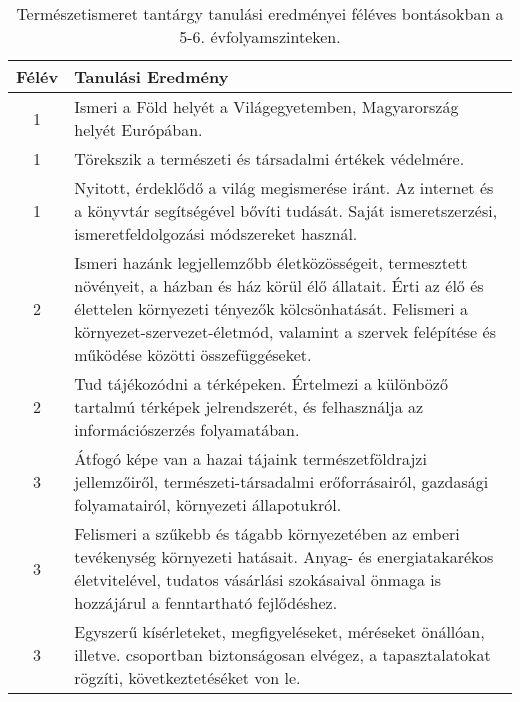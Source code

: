        
           \begin{longtable}{c | p{12cm} }
            \caption[Természetismeret 5-6.]{Természetismeret tantárgy tanulási eredményei féléves bontásokban a 5-6. évfolyamszinteken. }  \\

            \textbf{Félév} & \textbf{Tanulási Eredmény} \\
            \hline
            \endhead
                                
                                          1 &  Ismeri a Föld helyét a Világegyetemben, Magyarország helyét Európában. \\ \hline
                                          1 &  Törekszik a természeti és társadalmi értékek védelmére. \\ \hline
                                          1 &  Nyitott, érdeklődő a világ megismerése iránt. Az internet és a könyvtár segítségével bővíti tudását. Saját ismeretszerzési, ismeretfeldolgozási módszereket használ. \\ \hline
                                      
                                
                                          2 &  Ismeri hazánk legjellemzőbb életközösségeit, termesztett növényeit, a házban és ház körül élő állatait. Érti az élő és élettelen környezeti tényezők kölcsönhatását. Felismeri a környezet-szervezet-életmód, valamint a szervek felépítése és működése közötti összefüggéseket. \\ \hline
                                          2 &  Tud tájékozódni a térképeken. Értelmezi a különböző tartalmú térképek jelrendszerét, és felhasználja az információszerzés folyamatában. \\ \hline
                                      
                                
                                          3 &  Átfogó képe van a hazai tájaink természetföldrajzi jellemzőiről, természeti-társadalmi erőforrásairól, gazdasági folyamatairól, környezeti állapotukról. \\ \hline
                                          3 &  Felismeri a szűkebb és tágabb környezetében az emberi tevékenység környezeti hatásait. Anyag- és energiatakarékos életvitelével, tudatos vásárlási szokásaival önmaga is hozzájárul a fenntartható fejlődéshez. \\ \hline
                                          3 &  Egyszerű kísérleteket, megfigyeléseket, méréseket önállóan, illetve. csoportban biztonságosan elvégez, a tapasztalatokat rögzíti, következtetéséket von le. \\ \hline
                                      

\end{longtable}
